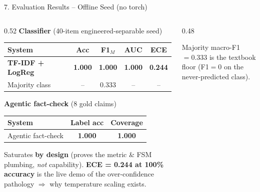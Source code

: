 \documentclass[10pt,aspectratio=169]{beamer}
\begin{document}
\begin{frame}{7. Evaluation Results -- Offline Seed (no torch)}
\begin{columns}[T]
\begin{column}{0.52\textwidth}
\textbf{Classifier} (40-item engineered-separable seed)
\begin{table}[h]
\centering\scriptsize
\begin{tabular}{lcccc}
\toprule
\textbf{System} & \textbf{Acc} & \textbf{F1$_M$} & \textbf{AUC} & \textbf{ECE} \\
\midrule
\textbf{TF-IDF + LogReg} & \textbf{1.000} & \textbf{1.000} & \textbf{1.000} & \textbf{0.244} \\
Majority class & -- & 0.333 & -- & -- \\
\bottomrule
\end{tabular}
\end{table}

\textbf{Agentic fact-check} (8 gold claims)
\begin{table}[h]
\centering\scriptsize
\begin{tabular}{lcc}
\toprule
\textbf{System} & \textbf{Label acc} & \textbf{Coverage} \\
\midrule
Agentic fact-check & \textbf{1.000} & \textbf{1.000} \\
\bottomrule
\end{tabular}
\end{table}

\scriptsize Saturates \textbf{by design} (proves the metric \& FSM plumbing, \emph{not} capability). \textbf{ECE = 0.244 at 100\% accuracy} is the live demo of the over-confidence pathology $\Rightarrow$ why temperature scaling exists.
\end{column}
\begin{column}{0.48\textwidth}
\centering
{}

\scriptsize Majority macro-F1 $= 0.333$ is the textbook floor (F1$=0$ on the never-predicted class).
\end{column}
\end{columns}
\end{frame}
\end{document}

